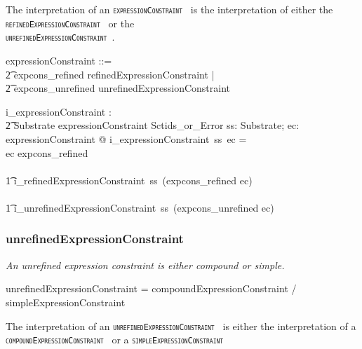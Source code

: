 \documentclass{article}
\def\spec#1{{\tt \small \textsc{{#1}} }}
\def\bnf#1{{\scriptsize {{#1}} }}
\def\desc#1{{\small \textsl{{#1}} }}
\begin{document}
The interpretation of an \spec{expressionConstraint} is the interpretation of either the  \spec{refinedExpressionConstraint} or the \\ \spec{unrefinedExpressionConstraint}.

\begin{zed}
expressionConstraint ::= \\
\t2 expcons\_refined \ldata refinedExpressionConstraint \rdata | \\
\t2 expcons\_unrefined \ldata unrefinedExpressionConstraint \rdata \\
\end{zed}


\begin{gendef}
   i\_expressionConstraint : \\
\t2 Substrate \fun expressionConstraint \fun Sctids\_or\_Error
\where
   \forall ss: Substrate; ec: expressionConstraint @ i\_expressionConstraint~ss~ec = \\
   \IF ec \in \ran expcons\_refined  \\
\THEN \\
\t1 i\_refinedExpressionConstraint~ss~(expcons\_refined \inv ec) \\
   \ELSE \\
\t1 i\_unrefinedExpressionConstraint~ss~(expcons\_unrefined \inv ec) 
\end{gendef}

\subsubsection{unrefinedExpressionConstraint}
\begin{framed}
\desc{An unrefined expression constraint is either compound or simple.}
\end{framed}
\begin{framed}
\noindent
\bnf{unrefinedExpressionConstraint = compoundExpressionConstraint / simpleExpressionConstraint}
\end{framed}

The interpretation of an \spec{unrefinedExpressionConstraint} is either the interpretation of a \spec{compoundExpressionConstraint} or a \spec{simpleExpressionConstraint}
\end{document}
